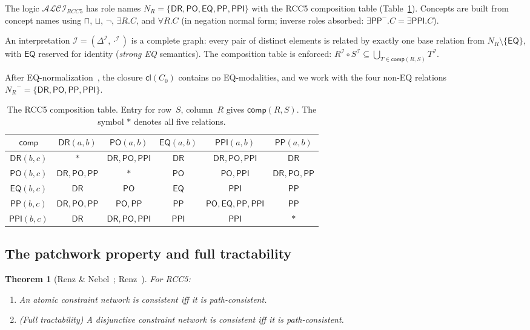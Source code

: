 \documentclass[a4paper,11pt]{article}
\newtheorem{theorem}{Theorem}[section]
\theoremstyle{definition}
\newcommand{\ALCIRCC}[1]{\ensuremath{\mathcal{ALCI}_{\mathit{RCC#1}}}}
\newcommand{\NR}{\ensuremath{N_R}}
\newcommand{\DeltaI}{\ensuremath{\Delta^{\mathcal{I}}}}
\newcommand{\interp}{\ensuremath{\mathcal{I}}}
\newcommand{\DR}{\ensuremath{\mathsf{DR}}}
\newcommand{\PO}{\ensuremath{\mathsf{PO}}}
\newcommand{\EQ}{\ensuremath{\mathsf{EQ}}}
\newcommand{\PP}{\ensuremath{\mathsf{PP}}}
\newcommand{\PPI}{\ensuremath{\mathsf{PPI}}}
\newcommand{\comp}{\ensuremath{\mathsf{comp}}}
\newcommand{\cl}{\ensuremath{\mathsf{cl}}}
\begin{document}
The logic $\ALCIRCC{5}$ has role names $\NR = \{\DR, \PO, \EQ, \PP,
\PPI\}$ with the RCC5 composition table (Table~\ref{tab:rcc5}).
Concepts are built from concept names using $\sqcap$, $\sqcup$,
$\neg$, $\exists R.C$, and $\forall R.C$ (in negation normal form;
inverse roles absorbed: $\exists \PP^{-}.C = \exists \PPI.C$).

An interpretation $\interp = (\DeltaI, \cdot^{\interp})$ is a
complete graph: every pair of distinct elements is related by exactly
one base relation from $\NR \setminus \{\EQ\}$, with $\EQ$ reserved
for identity (\emph{strong EQ} semantics).  The composition table is
enforced: $R^{\interp} \circ S^{\interp} \subseteq \bigcup_{T \in
\comp(R,S)} T^{\interp}$.

After EQ-normalization~\cite[Lemma~2.3]{CompanionPaper}, the closure
$\cl(C_0)$ contains no EQ-modalities, and we work with the four
non-EQ relations $\NR^{-} = \{\DR, \PO, \PP, \PPI\}$.

\begin{table}[t]
\centering
\caption{The RCC5 composition table.  Entry for row~$S$, column~$R$
gives $\comp(R, S)$.  The symbol $*$ denotes all five relations.}
\label{tab:rcc5}
\smallskip
\renewcommand{\arraystretch}{1.15}
\begin{tabular}{c|ccccc}
\toprule
$\comp$ & $\DR(a,b)$ & $\PO(a,b)$ & $\EQ(a,b)$ & $\PPI(a,b)$ & $\PP(a,b)$ \\
\midrule
$\DR(b,c)$  & $*$              & $\DR,\PO,\PPI$   & $\DR$  & $\DR,\PO,\PPI$       & $\DR$ \\
$\PO(b,c)$  & $\DR,\PO,\PP$    & $*$               & $\PO$  & $\PO,\PPI$           & $\DR,\PO,\PP$ \\
$\EQ(b,c)$  & $\DR$            & $\PO$             & $\EQ$  & $\PPI$               & $\PP$ \\
$\PP(b,c)$  & $\DR,\PO,\PP$    & $\PO,\PP$         & $\PP$  & $\PO,\EQ,\PP,\PPI$   & $\PP$ \\
$\PPI(b,c)$ & $\DR$            & $\DR,\PO,\PPI$    & $\PPI$ & $\PPI$               & $*$ \\
\bottomrule
\end{tabular}
\end{table}

\subsection{The patchwork property and full tractability}

\begin{theorem}[Renz \& Nebel~\cite{RenzNebel1999}; Renz~\cite{Renz1999}]
\label{thm:patchwork}
For RCC5:
\begin{enumerate}[nosep,label=(\roman*)]
  \item An atomic constraint network is consistent iff it is
    path-consistent.
  \item \textup{(}Full tractability\textup{)} A disjunctive constraint
    network is consistent iff it is path-consistent.
\end{enumerate}
\end{theorem}
\end{document}
